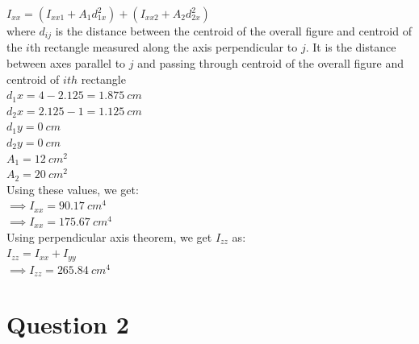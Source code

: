 \documentclass{article}
\begin{document}
\noindent $I_{xx}=(I_{xx1}+A_1d_{1x}^2) +(I_{xx2}+A_2d_{2x}^2)$\\
where $d_{ij}$ is the distance between the centroid of the overall figure and centroid of the $i$th rectangle measured along the axis perpendicular to $j$. It is the distance between axes parallel to $j$ and passing through centroid of the overall figure and centroid of $ith$ rectangle \\
$d_1x=4-2.125= 1.875 \ cm$\\
$d_2x=2.125-1= 1.125 \ cm$\\
$d_1y=0 \ cm$\\
$d_2y=0 \ cm$\\
$A_1= 12 \ cm^2$\\
$A_2= 20 \ cm^2$\\

\noindent Using these values, we get: \\
$\implies I_{xx} = 90.17\ cm^4$\\
$\implies I_{xx} = 175.67\ cm^4$\\

\noindent Using perpendicular axis theorem, we get $I_{zz}$ as:\\
$I_{zz}=I_{xx}+I_{yy}$\\
$\implies I_{zz}= 265.84\ cm^4$

 


\newpage

\section{Question 2}
\end{document}

